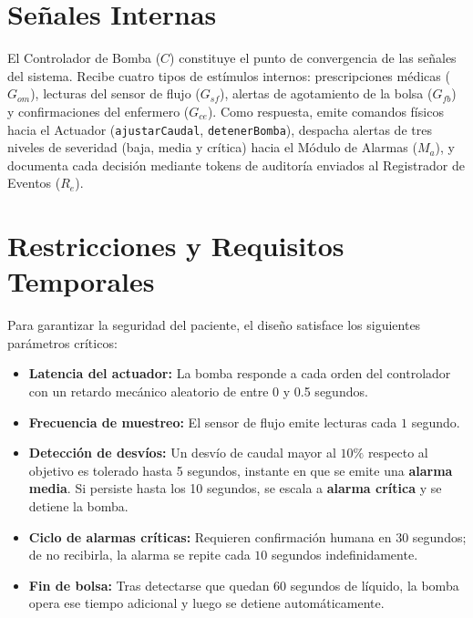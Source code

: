 \section{Señales Internas}
El Controlador de Bomba ($C$) constituye el punto de convergencia de las señales del sistema. Recibe cuatro tipos de estímulos internos: prescripciones médicas ($G_{om}$), lecturas del sensor de flujo ($G_{sf}$), alertas de agotamiento de la bolsa ($G_{fb}$) y confirmaciones del enfermero ($G_{ce}$). Como respuesta, emite comandos físicos hacia el Actuador (\texttt{ajustarCaudal}, \texttt{detenerBomba}), despacha alertas de tres niveles de severidad (baja, media y crítica) hacia el Módulo de Alarmas ($M_a$), y documenta cada decisión mediante tokens de auditoría enviados al Registrador de Eventos ($R_e$).

\section{Restricciones y Requisitos Temporales}
Para garantizar la seguridad del paciente, el diseño satisface los siguientes parámetros críticos:
\begin{itemize}
    \item \textbf{Latencia del actuador:} La bomba responde a cada orden del controlador con un retardo mecánico aleatorio de entre 0 y 0.5 segundos.
    \item \textbf{Frecuencia de muestreo:} El sensor de flujo emite lecturas cada $1$ segundo.
    \item \textbf{Detección de desvíos:} Un desvío de caudal mayor al $10\%$ respecto al objetivo es tolerado hasta 5 segundos, instante en que se emite una \textbf{alarma media}. Si persiste hasta los 10 segundos, se escala a \textbf{alarma crítica} y se detiene la bomba.
    \item \textbf{Ciclo de alarmas críticas:} Requieren confirmación humana en $30$ segundos; de no recibirla, la alarma se repite cada $10$ segundos indefinidamente.
    \item \textbf{Fin de bolsa:} Tras detectarse que quedan 60 segundos de líquido, la bomba opera ese tiempo adicional y luego se detiene automáticamente.
\end{itemize}
